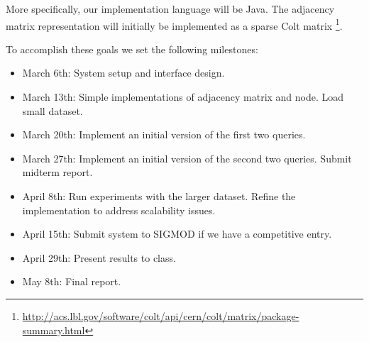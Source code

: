 \documentclass{article}
\begin{document}
More specifically, our implementation language will be Java.  The adjacency matrix representation will initially be implemented as a sparse Colt matrix \footnote{\url{http://acs.lbl.gov/software/colt/api/cern/colt/matrix/package-summary.html}}.

To accomplish these goals we set the following milestones:

\begin{itemize}
\item March 6th: System setup and interface design.
\item March 13th: Simple implementations of adjacency matrix and node. Load small dataset.
\item March 20th: Implement an initial version of the first two queries.
\item March 27th: Implement an initial version of the second two queries. Submit midterm report.
\item April 8th: Run experiments with the larger dataset. Refine the implementation to address scalability issues.
\item April 15th: Submit system to SIGMOD if we have a competitive entry.
\item April 29th: Present results to class.
\item May 8th: Final report.
\end{itemize}



\end{document}
